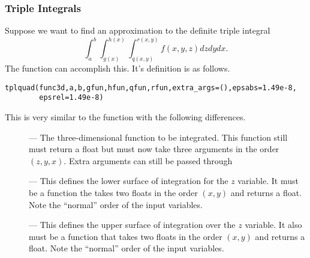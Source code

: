 \subsubsection{Triple Integrals}

Suppose we want to find an approximation to the definite triple
integral
\[
\int_a^b \int_{g(x)}^{h(x)} \int_{q(x,y)}^{r(x,y)} f(x,y,z) dz dy dx.
\]
The function  can accomplish this.  It's definition is
as follows.
\begin{verbatim}
tplquad(func3d,a,b,gfun,hfun,qfun,rfun,extra_args=(),epsabs=1.49e-8,
        epsrel=1.49e-8)
\end{verbatim}
This is very similar to the function  with the following
differences.
\begin{description}
\item[] --- The three-dimensional function to be
integrated.  This function still must return a float but must now take
three arguments in the order $(z,y,x)$.  Extra arguments can still be
passed through 
\item[] --- This defines the lower surface of integration
for the $z$ variable.  It must be a function the takes two floats in
the order $(x,y)$ and returns a float.  Note the ``normal'' order of
the input variables.
\item[] --- This defines the upper surface of integration
over the $z$ variable. It also must be a function that takes two
floats in the order $(x,y)$ and returns a float.  Note the ``normal''
order of the input variables.
\end{description}









